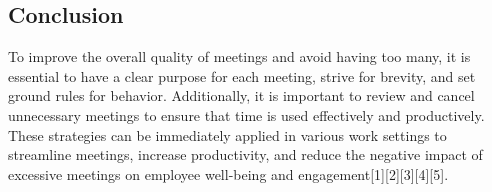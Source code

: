 \subsection{Conclusion}
To improve the overall quality of meetings and avoid having too many, it is essential to have a clear purpose for each meeting, strive for brevity, and set ground rules for behavior. Additionally, it is important to review and cancel unnecessary meetings to ensure that time is used effectively and productively.\\

These strategies can be immediately applied in various work settings to streamline meetings, increase productivity, and reduce the negative impact of excessive meetings on employee well-being and engagement[1][2][3][4][5].
